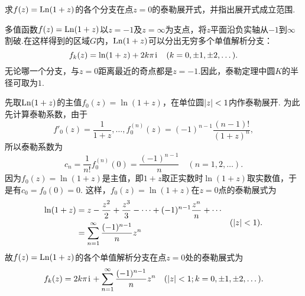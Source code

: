 \begin{example}
求\(f(z) = \operatorname{Ln}(1+z)\)的各个分支在点\(z = 0\)的泰勒展开式，并指出展开式成立范围.
\begin{solution}
多值函数\(f(z) = \operatorname{Ln}(1+z)\)以\(z = -1\)及\(z = \infty\)为支点，将\(z\)平面沿负实轴从\(-1\)到\(\infty\)割破.在这样得到的区域\(G\)内，\(\operatorname{Ln}(1+z)\)可以分出无穷多个单值解析分支：\[
f_k(z) = \ln(1+z) + 2k\pi\kern1pt\mathrm{i}\kern1pt
\quad(k=0,\pm1,\pm2,\dotsc).
\]无论哪一个分支，与\(z = 0\)距离最近的奇点都是\(z = -1\).因此，泰勒定理中圆\(K\)的半径可取为\(1\).

先取\(\operatorname{Ln}(1+z)\)的主值\(f_0(z) = \ln(1+z)\)，在单位圆\(\abs{z}<1\)内作泰勒展开.
为此先计算泰勒系数，由于\[
f'_0(z) = \frac{1}{1+z},
\dotsc,
f^{(n)}_0(z) = (-1)^{n-1} \frac{(n-1)!}{(1+z)^n},
\]所以泰勒系数为\[
c_n = \frac{1}{n!} f^{(n)}_0(0) = \frac{(-1)^{n-1}}{n}
\quad (n=1,2,\dotsc).
\]因为\(f_0(z) = \ln(1+z)\)是主值，即\(1+z\)取正实数时\(\ln(1+z)\)取实数值，于是有\(c_0 = f_0(0) = 0\).
这样，\(f_0(z) = \ln(1+z)\)在\(z = 0\)点的泰勒展式为\begin{equation}\label{equation:解析函数的级数表示.对数函数的泰勒展式}
\begin{split}
\ln(1+z) &= z - \frac{z^2}{2} + \frac{z^3}{3} - \dotsb + (-1)^{n-1} \frac{z^n}{n} + \dotsb \\
&= \sum_{n=1}^\infty \frac{(-1)^{n-1}}{n} z^n
\end{split}
\quad (\abs{z} < 1).
\end{equation}故\(f(z) = \operatorname{Ln}(1+z)\)的各个单值解析分支在点\(z = 0\)处的泰勒展式为\[
f_k(z) = 2k\pi\kern1pt\mathrm{i}\kern1pt + \sum_{n=1}^\infty \frac{(-1)^{n-1}}{n} z^n
\quad (\abs{z} < 1; k=0,\pm1,\pm2,\dotsc).
\]
\end{solution}
\end{example}

